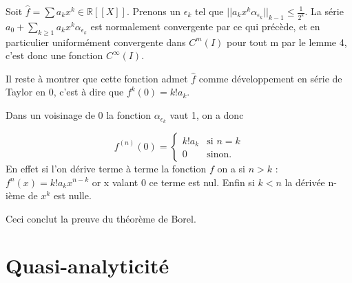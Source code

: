 \documentclass[12pt,a4paper]{amsart}
\begin{document}
Soit $\hat{f} = \sum a_{k} x^{k} \in \mathbb{R}[[X]]$. Prenons un $\epsilon_{k}$ tel que $||a_{k}x^{k} \alpha_{\epsilon_{k}}||_{k-1}\leq \frac{1}{2^{k}}$. La série $a_{0} + \sum_{k\geq1}a_{k}x^{k} \alpha_{\epsilon_{k}}$ est normalement convergente par ce qui précède, et en particulier uniformément convergente dans $C^{m}(I)$ pour tout m par le lemme 4, c'est donc une fonction $C^{\infty}(I)$. 

Il reste à montrer que cette fonction admet $\hat{f}$ comme développement en série de Taylor en 0, c'est à dire que $f^{k}(0)=k! a_{k}$.

Dans un voisinage de 0 la fonction $\alpha_{\epsilon_{k}}$ vaut 1, on a donc 

$$
f^{(n)}(0) = \left\{
    \begin{array}{ll}
       k! a_{k} & \mbox{si } n=k\\
        0 & \mbox{sinon.}
    \end{array}
\right.
$$
En effet si l'on dérive terme à terme la fonction $f$ on a si $n>k$ : $f^{n}(x)= k! a_{k} x^{n-k} $ or x valant 0 ce terme est nul. Enfin si $k<n$ la dérivée n-ième de $x^{k}$ est nulle.

Ceci conclut la preuve du théorème de Borel.\\

\section{Quasi-analyticité}

\end{document}
